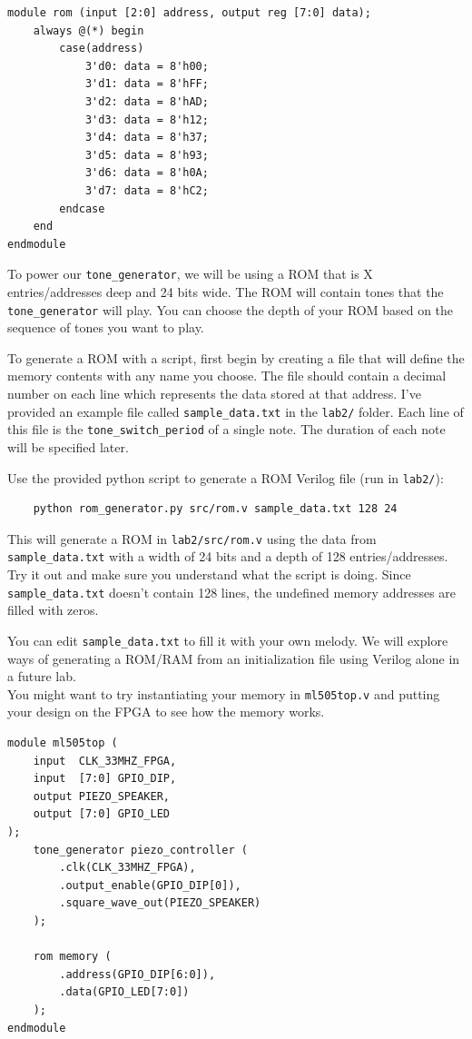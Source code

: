 \documentclass[11pt]{article}
\begin{document}
\begin{verbatim}
module rom (input [2:0] address, output reg [7:0] data);
	always @(*) begin
		case(address)
			3'd0: data = 8'h00;
			3'd1: data = 8'hFF;
			3'd2: data = 8'hAD;
			3'd3: data = 8'h12;
			3'd4: data = 8'h37;
			3'd5: data = 8'h93;
			3'd6: data = 8'h0A;
			3'd7: data = 8'hC2;
		endcase
	end
endmodule
\end{verbatim}

To power our \verb|tone_generator|, we will be using a ROM that is X entries/addresses deep and 24 bits wide. The ROM will contain tones that the \verb|tone_generator| will play. You can choose the depth of your ROM based on the sequence of tones you want to play.

To generate a ROM with a script, first begin by creating a file that will define the memory contents with any name you choose. The file should contain a decimal number on each line which represents the data stored at that address. I've provided an example file called \verb|sample_data.txt| in the \verb|lab2/| folder. Each line of this file is the \verb|tone_switch_period| of a single note. The duration of each note will be specified later.

Use the provided python script to generate a ROM Verilog file (run in \verb|lab2/|):

\begin{verbatim}
	python rom_generator.py src/rom.v sample_data.txt 128 24
\end{verbatim}

This will generate a ROM in \verb|lab2/src/rom.v| using the data from \verb|sample_data.txt| with a width of 24 bits and a depth of 128 entries/addresses. Try it out and make sure you understand what the script is doing. Since \verb|sample_data.txt| doesn't contain 128 lines, the undefined memory addresses are filled with zeros.

You can edit \verb|sample_data.txt| to fill it with your own melody. We will explore ways of generating a ROM/RAM from an initialization file using Verilog alone in a future lab.\\

You might want to try instantiating your memory in \verb|ml505top.v| and putting your design on the FPGA to see how the memory works.

\begin{verbatim}
module ml505top (
	input  CLK_33MHZ_FPGA,
	input  [7:0] GPIO_DIP,
	output PIEZO_SPEAKER,
	output [7:0] GPIO_LED
);    
	tone_generator piezo_controller (
		.clk(CLK_33MHZ_FPGA),
		.output_enable(GPIO_DIP[0]),
		.square_wave_out(PIEZO_SPEAKER)
	);

	rom memory (
		.address(GPIO_DIP[6:0]),
		.data(GPIO_LED[7:0])
	);
endmodule
\end{verbatim}
\end{document}
